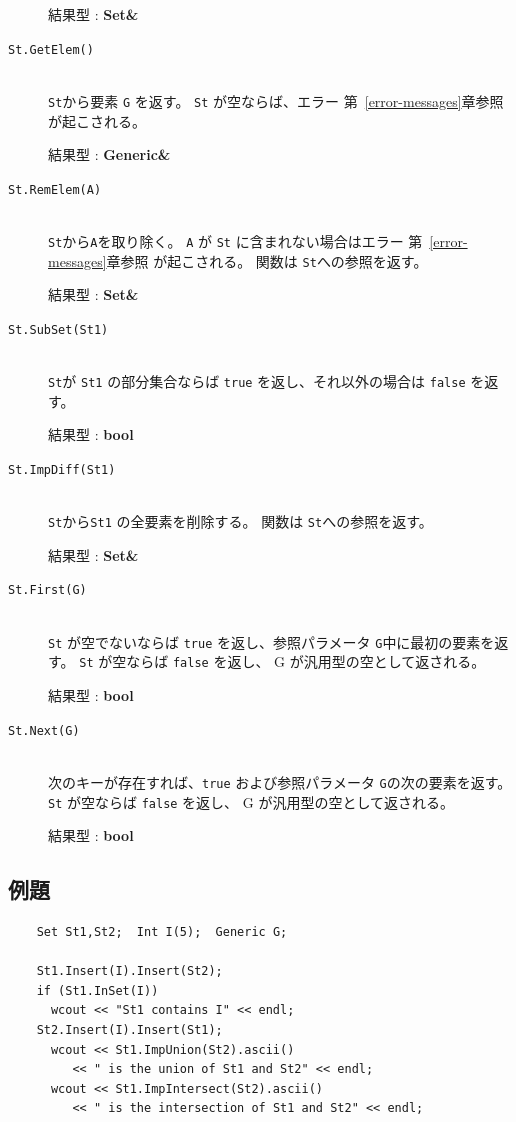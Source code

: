 \documentclass[\pformat,12pt]{jarticle}
\begin{document}
\begin{description}
     結果型 : {\bf Set\&}

\item[{\tt St.GetElem()}] \mbox{}\\     
     {\tt St}から要素 {\tt G} を返す。 
 {\tt St} が空ならば、エラー 第~\ref{error-messages}章参照 が起こされる。

     結果型 : {\bf Generic\&}

\item[{\tt St.RemElem(A)}] \mbox{}\\     
     {\tt St}から{\tt A}を取り除く。 
     {\tt A} が {\tt St} に含まれない場合はエラー 第~\ref{error-messages}章参照 が起こされる。 
     関数は {\tt St}への参照を返す。

     結果型 : {\bf Set\&}

\item[{\tt St.SubSet(St1)}] \mbox{}\\     
     {\tt St}が {\tt St1} の部分集合ならば {\tt true} を返し、それ以外の場合は {\tt false} を返す。

     結果型 : {\bf bool}

\item[{\tt St.ImpDiff(St1)}] \mbox{}\\     
    {\tt St}から{\tt St1} の全要素を削除する。
     関数は {\tt St}への参照を返す。

     結果型 : {\bf Set\&}

\item[{\tt St.First(G)}] \mbox{}\\     
     {\tt St} が空でないならば {\tt true} を返し、参照パラメータ {\tt G}中に最初の要素を返す。 
 {\tt St} が空ならば {\tt false} を返し、 G が汎用型の空として返される。

     結果型 : {\bf bool}
    
\item[{\tt St.Next(G)}] \mbox{}\\     
      次のキーが存在すれば、{\tt true} および参照パラメータ {\tt G}の次の要素を返す。
 {\tt St} が空ならば {\tt false} を返し、 G が汎用型の空として返される。

     結果型 : {\bf bool}
\end{description}

\subsection*{例題}
\begin{verbatim}
    Set St1,St2;  Int I(5);  Generic G;

    St1.Insert(I).Insert(St2);
    if (St1.InSet(I))
      wcout << "St1 contains I" << endl;
    St2.Insert(I).Insert(St1);
      wcout << St1.ImpUnion(St2).ascii() 
         << " is the union of St1 and St2" << endl;
      wcout << St1.ImpIntersect(St2).ascii() 
         << " is the intersection of St1 and St2" << endl;
\end{verbatim}
\end{document}
